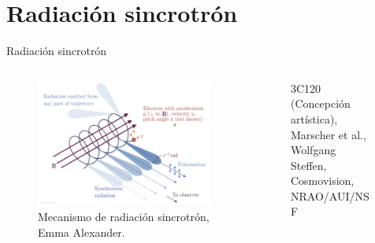\documentclass[xetex,aspectratio=169]{beamer}
\begin{document}
	\section{Radiación sincrotrón}
	\begin{frame}{Radiación sincrotrón}
		\begin{columns}
			
			\begin{column}{0.48\textwidth}
				\begin{figure}
					\includegraphics[width=\textwidth, keepaspectratio]{./figures/synchrotron/synchrotron.png}
					\caption*{Mecanismo de radiación sincrotrón, Emma Alexander.}
				\end{figure}
			\end{column}
			
			\begin{column}{0.48\textwidth}
				\begin{figure}
					\caption*{3C120 (Concepción artística), Marscher et al., Wolfgang Steffen, Cosmovision, NRAO/AUI/NSF}
				\end{figure}
				
				
			\end{column}
		\end{columns}
	\end{frame}
	
\end{document}
